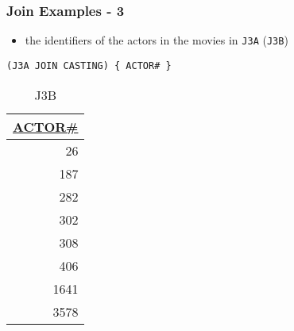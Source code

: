 \documentclass[dvipsnames]{beamer}
\theoremstyle{plain}
\begin{document}
\begin{frame}[fragile]
  \frametitle{Join Examples - 3}

  \begin{example}
    \begin{itemize}
      \item the identifiers of the actors in the movies in \texttt{J3A}
        (\texttt{J3B})
    \end{itemize}

    \begin{lstlisting}
(J3A JOIN CASTING) { ACTOR# }
    \end{lstlisting}

    \pause
    \vspace{-10pt}
    \begin{tiny}
    \begin{table}
      \caption{J3B}
      \begin{tabular}{|r|}\hline
\underline{ACTOR\#}\\[2pt]\hline\hline
                 26\\\hline
                187\\\hline
                282\\\hline
                302\\\hline
                308\\\hline
                406\\\hline
               1641\\\hline
               3578\\\hline
      \end{tabular}
    \end{table}
    \end{tiny}
  \end{example}
\end{frame}
\end{document}
